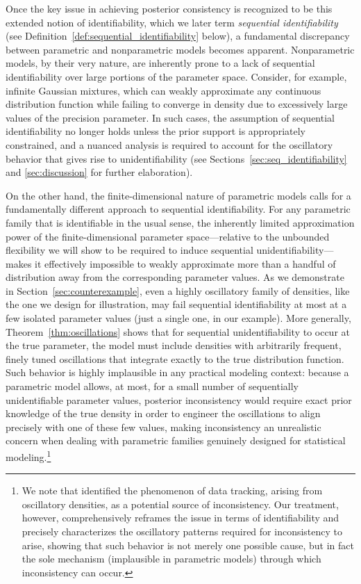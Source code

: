 \documentclass[11pt,twoside]{article}
\begin{document}
Once the key issue in achieving posterior consistency is recognized to be this extended notion of identifiability, which we later term \emph{sequential identifiability} (see Definition~\ref{def:sequential_identifiability} below), a fundamental discrepancy between parametric and nonparametric models becomes apparent. Nonparametric models, by their very nature, are inherently prone to a lack of sequential identifiability over large portions of the parameter space. Consider, for example, infinite Gaussian mixtures, which can weakly approximate any continuous distribution function while failing to converge in density due to excessively large values of the precision parameter. In such cases, the assumption of sequential identifiability no longer holds unless the prior support is appropriately constrained, and a nuanced analysis is required to account for the oscillatory behavior that gives rise to unidentifiability (see Sections~\ref{sec:seq_identifiability} and \ref{sec:discussion} for further elaboration).

On the other hand, the finite-dimensional nature of parametric models calls for a fundamentally different approach to sequential identifiability. For any parametric family that is identifiable in the usual sense, the inherently limited approximation power of the finite-dimensional parameter space—relative to the unbounded flexibility we will show to be required to induce sequential unidentifiability—makes it effectively impossible to weakly approximate more than a handful of distribution away from the corresponding parameter values. As we demonstrate in Section~\ref{sec:counterexample}, even a highly oscillatory family of densities, like the one we design for illustration, may fail sequential identifiability at most at a few isolated parameter values (just a single one, in our example). More generally, Theorem~\ref{thm:oscillations} shows that for sequential unidentifiability to occur at the true parameter, the model must include densities with arbitrarily frequent, finely tuned oscillations that integrate exactly to the true distribution function. Such behavior is highly implausible in any practical modeling context: because a parametric model allows, at most, for a small number of sequentially unidentifiable parameter values, posterior inconsistency would require exact prior knowledge of the true density in order to engineer the oscillations to align precisely with one of these few values, making inconsistency an unrealistic concern when dealing with parametric families genuinely designed for statistical modeling.\footnote{We note that \cite{walker2005data} identified the phenomenon of data tracking, arising from oscillatory densities, as a potential source of inconsistency. Our treatment, however, comprehensively reframes the issue in terms of identifiability and precisely characterizes the oscillatory patterns required for inconsistency to arise, showing that such behavior is not merely one possible cause, but in fact the sole mechanism (implausible in parametric models) through which inconsistency can occur.}
\end{document}
